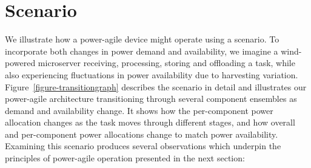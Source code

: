 \section{Scenario}
\label{section-scenario}



We illustrate how a power-agile device might operate using a scenario. To
incorporate both changes in power demand and availability, we imagine a
wind-powered microserver receiving, processing, storing and offloading a
task, while also experiencing fluctuations in power availability due to
harvesting variation. Figure~\ref{figure-transitiongraph} describes the
scenario in detail and illustrates our power-agile architecture transitioning
through several component ensembles as demand and availability change. It
shows how the per-component power allocation changes as the task moves
through different stages, and how overall and per-component power allocations
change to match power availability. Examining this scenario produces several
observations which underpin the principles of power-agile operation presented
in the next section:

